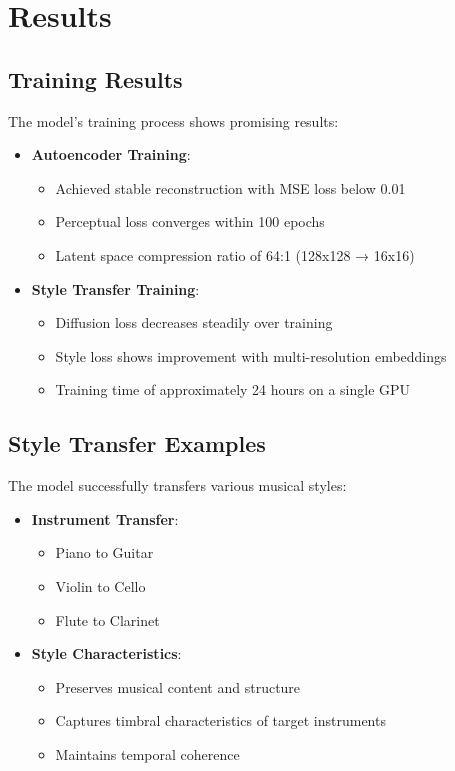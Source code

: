 \section{Results}

\subsection{Training Results}
The model's training process shows promising results:

\begin{itemize}
    \item \textbf{Autoencoder Training}:
    \begin{itemize}
        \item Achieved stable reconstruction with MSE loss below 0.01
        \item Perceptual loss converges within 100 epochs
        \item Latent space compression ratio of 64:1 (128x128 → 16x16)
    \end{itemize}
    
    \item \textbf{Style Transfer Training}:
    \begin{itemize}
        \item Diffusion loss decreases steadily over training
        \item Style loss shows improvement with multi-resolution embeddings
        \item Training time of approximately 24 hours on a single GPU
    \end{itemize}
\end{itemize}

\subsection{Style Transfer Examples}
The model successfully transfers various musical styles:

\begin{itemize}
    \item \textbf{Instrument Transfer}:
    \begin{itemize}
        \item Piano to Guitar
        \item Violin to Cello
        \item Flute to Clarinet
    \end{itemize}
    
    \item \textbf{Style Characteristics}:
    \begin{itemize}
        \item Preserves musical content and structure
        \item Captures timbral characteristics of target instruments
        \item Maintains temporal coherence
    \end{itemize}
\end{itemize}

